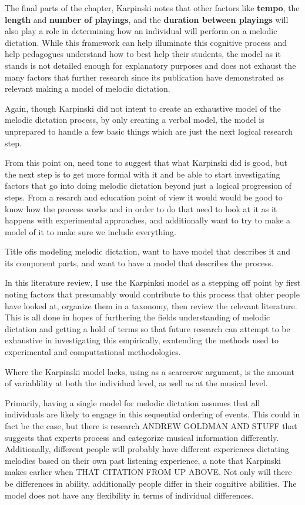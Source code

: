 \documentclass[]{book}
\theoremstyle{definition}
\theoremstyle{definition}
\theoremstyle{definition}
\theoremstyle{remark}
\begin{document}
The final parts of the chapter, Karpinski notes that other factors like
\textbf{tempo}, the \textbf{length} and \textbf{number of playings}, and
the \textbf{duration between playings} will also play a role in
determining how an individual will perform on a melodic dictation. While
this framework can help illuminate this cognitive process and help
pedagogues understand how to best help their students, the model as it
stands is not detailed enough for explanatory purposes and does not
exhaust the many factors that further research since its publication
have demonstrated as relevant making a model of melodic dictation.

Again, though Karpinski did not intent to create an exhaustive model of
the melodic dictation process, by only creating a verbal model, the
model is unprepared to handle a few basic things which are just the next
logical research step.

From this point on, need tone to suggest that what Karpinski did is
good, but the next step is to get more formal with it and be able to
start investigating factors that go into doing melodic dictation beyond
just a logical progression of steps. From a resarch and education point
of view it would would be good to know how the process works and in
order to do that need to look at it as it happens with experimental
approaches, and additionally want to try to make a model of it to make
sure we include everything.

Title ofis modeling melodic dictation, want to have model that describes
it and its component parts, and want to have a model that describes the
process.

In this literature review, I use the Karpinksi model as a stepping off
point by first noting factors that presumably would contribute to this
process that ohter people have looked at, organize them in a taxonomy,
then review the relevant literature. This is all done in hopes of
furthering the fields understanding of melodic dictation and getting a
hold of terms so that future research can attempt to be exhaustive in
investigating this empirically, exntending the methods used to
experimental and computtational methodologies.

Where the Karpinski model lacks, using as a scarecrow argument, is the
amount of variablility at both the individual level, as well as at the
musical level.

Primarily, having a single model for melodic dictation assumes that all
individuals are likely to engage in this sequential ordering of events.
This could in fact be the case, but there is research ANDREW GOLDMAN AND
STUFF that suggests that experts process and categorize musical
information differently. Additionally, different people will probably
have different experiences dictating melodies based on their own past
listening experience, a note that Karpinski makes earlier when THAT
CITATION FROM UP ABOVE. Not only will there be differences in ability,
additionally people differ in their cognitive abilities. The model does
not have any flexibility in terms of individual differences.
\end{document}
